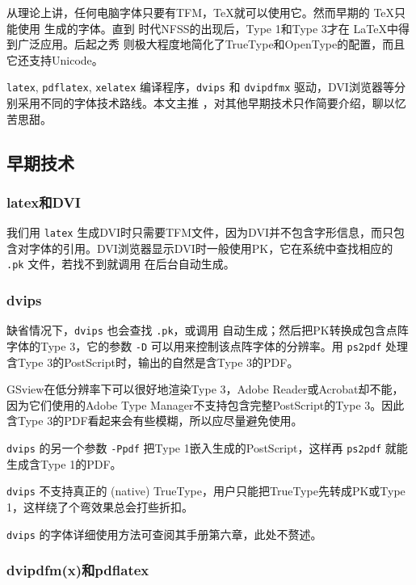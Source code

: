从理论上讲，任何电脑字体只要有TFM，\TeX 就可以使用它。然而早期的 \TeX 只能使用 \MF 生成的字体。直到 \LaTeXe 时代NFSS的出现后，Type 1和Type 3才在 \LaTeX 中得到广泛应用。后起之秀 \XeTeX 则极大程度地简化了TrueType和OpenType的配置，而且它还支持Unicode。

\texttt{latex}, \texttt{pdflatex}, \texttt{xelatex} 编译程序，\texttt{dvips} 和 \texttt{dvipdfmx} 驱动，DVI浏览器等分别采用不同的字体技术路线。本文主推 \XeLaTeX ，对其他早期技术只作简要介绍，聊以忆苦思甜。

\subsection{早期技术}

\subsubsection{latex和DVI}

我们用 \texttt{latex} 生成DVI时只需要TFM文件，因为DVI并不包含字形信息，而只包含对字体的引用。DVI浏览器显示DVI时一般使用PK，它在系统中查找相应的 \texttt{.pk} 文件，若找不到就调用 \MF 在后台自动生成。

\subsubsection{dvips}

缺省情况下，\texttt{dvips} 也会查找 \texttt{.pk}，或调用 \MF 自动生成；然后把PK转换成包含点阵字体的Type 3，它的参数 \texttt{-D} 可以用来控制该点阵字体的分辨率。用 \texttt{ps2pdf} 处理含Type 3的PostScript时，输出的自然是含Type 3的PDF。

GSview在低分辨率下可以很好地渲染Type 3，Adobe Reader或Acrobat却不能，因为它们使用的Adobe Type Manager不支持包含完整PostScript的Type 3。因此含Type 3的PDF看起来会有些模糊，所以应尽量避免使用。

\texttt{dvips} 的另一个参数 \texttt{-Ppdf} 把Type 1嵌入生成的PostScript，这样再 \texttt{ps2pdf} 就能生成含Type 1的PDF。

\texttt{dvips} 不支持真正的 (native) TrueType，用户只能把TrueType先转成PK或Type 1，这样绕了个弯效果总会打些折扣。

\texttt{dvips} 的字体详细使用方法可查阅其手册\citep{Rokicki_2005}第六章，此处不赘述。

\subsubsection{dvipdfm(x)和pdflatex}

